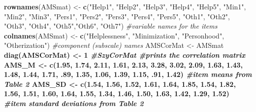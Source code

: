 \documentclass[
  english,
]{book}
\newenvironment{Shaded}{\begin{snugshade}}{\end{snugshade}}
\newcommand{\CommentTok}[1]{\textcolor[rgb]{0.56,0.35,0.01}{\textit{#1}}}
\newcommand{\DecValTok}[1]{\textcolor[rgb]{0.00,0.00,0.81}{#1}}
\newcommand{\FloatTok}[1]{\textcolor[rgb]{0.00,0.00,0.81}{#1}}
\newcommand{\KeywordTok}[1]{\textcolor[rgb]{0.13,0.29,0.53}{\textbf{#1}}}
\newcommand{\NormalTok}[1]{#1}
\newcommand{\OperatorTok}[1]{\textcolor[rgb]{0.81,0.36,0.00}{\textbf{#1}}}
\newcommand{\StringTok}[1]{\textcolor[rgb]{0.31,0.60,0.02}{#1}}
\begin{document}
\begin{Shaded}
\begin{Highlighting}[]
\KeywordTok{rownames}\NormalTok{(AMSmat) <-}\StringTok{ }\KeywordTok{c}\NormalTok{(}\StringTok{"Help1"}\NormalTok{, }\StringTok{"Help2"}\NormalTok{, }\StringTok{"Help3"}\NormalTok{, }\StringTok{"Help4"}\NormalTok{, }\StringTok{"Help5"}\NormalTok{, }\StringTok{"Min1"}\NormalTok{, }\StringTok{"Min2"}\NormalTok{, }\StringTok{"Min3"}\NormalTok{, }\StringTok{"Pers1"}\NormalTok{, }\StringTok{"Pers2"}\NormalTok{, }\StringTok{"Pers3"}\NormalTok{, }\StringTok{"Pers4"}\NormalTok{, }\StringTok{"Pers5"}\NormalTok{, }\StringTok{"Oth1"}\NormalTok{, }\StringTok{"Oth2"}\NormalTok{, }\StringTok{"Oth3"}\NormalTok{, }\StringTok{"Oth4"}\NormalTok{, }\StringTok{"Oth5"}\NormalTok{,}\StringTok{"Oth6"}\NormalTok{, }\StringTok{"Oth7"}\NormalTok{) }\CommentTok{#variable names for the items}
\KeywordTok{colnames}\NormalTok{(AMSmat) <-}\StringTok{ }\KeywordTok{c}\NormalTok{(}\StringTok{"Helplessness"}\NormalTok{, }\StringTok{"Minimization"}\NormalTok{, }\StringTok{"Personhood"}\NormalTok{, }\StringTok{"Otherization"}\NormalTok{) }\CommentTok{#component (subscale) names}
\NormalTok{AMSCorMat <-}\StringTok{ }\NormalTok{AMSmat }\OperatorTok{%
\KeywordTok{diag}\NormalTok{(AMSCorMat) <-}\StringTok{ }\DecValTok{1}
\CommentTok{#SzyCorMat #prints the correlation matrix}
\NormalTok{AMS_M <-}\StringTok{ }\KeywordTok{c}\NormalTok{(}\FloatTok{1.95}\NormalTok{, }\FloatTok{1.74}\NormalTok{, }\FloatTok{2.11}\NormalTok{, }\FloatTok{1.61}\NormalTok{, }\FloatTok{2.13}\NormalTok{, }\FloatTok{3.28}\NormalTok{, }\FloatTok{3.02}\NormalTok{, }\FloatTok{2.09}\NormalTok{, }\FloatTok{1.63}\NormalTok{, }\FloatTok{1.43}\NormalTok{, }\FloatTok{1.48}\NormalTok{, }\FloatTok{1.44}\NormalTok{, }\FloatTok{1.71}\NormalTok{, }\FloatTok{.89}\NormalTok{, }\FloatTok{1.35}\NormalTok{, }\FloatTok{1.06}\NormalTok{, }\FloatTok{1.39}\NormalTok{, }\FloatTok{1.15}\NormalTok{, }\FloatTok{.91}\NormalTok{, }\FloatTok{1.42}\NormalTok{) }\CommentTok{#item means from Table 2}
\NormalTok{AMS_SD <-}\StringTok{ }\KeywordTok{c}\NormalTok{(}\FloatTok{1.54}\NormalTok{, }\FloatTok{1.56}\NormalTok{, }\FloatTok{1.52}\NormalTok{, }\FloatTok{1.61}\NormalTok{, }\FloatTok{1.64}\NormalTok{, }\FloatTok{1.85}\NormalTok{, }\FloatTok{1.54}\NormalTok{, }\FloatTok{1.82}\NormalTok{, }\FloatTok{1.56}\NormalTok{, }\FloatTok{1.51}\NormalTok{, }\FloatTok{1.60}\NormalTok{, }\FloatTok{1.64}\NormalTok{, }\FloatTok{1.55}\NormalTok{, }\FloatTok{1.34}\NormalTok{, }\FloatTok{1.46}\NormalTok{, }\FloatTok{1.50}\NormalTok{, }\FloatTok{1.63}\NormalTok{, }\FloatTok{1.42}\NormalTok{, }\FloatTok{1.29}\NormalTok{, }\FloatTok{1.52}\NormalTok{) }\CommentTok{#item standard deviations from Table 2}
}
\end{Highlighting}
\end{Shaded}
\end{document}
